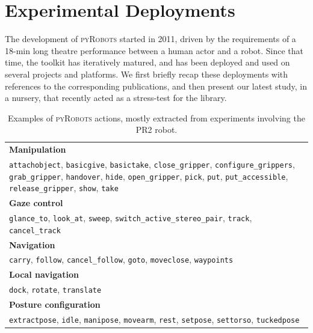 \documentclass[a4paper, 10pt, conference]{ieeeconf}      %
\newcommand{\pyRobots}{\textsc{pyRobots}}
\begin{document}
\section{Experimental Deployments}

The development of \pyRobots{} started in 2011, driven by the requirements of a
18-min long theatre performance between a human actor and a robot. Since that time, the toolkit has
iteratively matured, and has been deployed and used on several projects and
platforms. We first briefly recap these deployments with references to the
corresponding publications, and then present our latest study, in a nursery,
that recently acted as a stress-test for the library.

\begin{table}[ht!]
\begin{center}
\begin{tabular}{p{}}
    \toprule
    {\bf Manipulation} \\
     {\tt attachobject}, {\tt basicgive}, {\tt basictake}, {\tt close\_gripper}, {\tt configure\_grippers}, {\tt grab\_gripper}, {\tt handover}, {\tt hide}, {\tt open\_gripper}, {\tt pick}, {\tt put}, {\tt put\_accessible}, {\tt release\_gripper}, {\tt show}, {\tt take} \\
     \midrule
    {\bf Gaze control} \\
     {\tt glance\_to}, {\tt look\_at}, {\tt sweep}, {\tt switch\_active\_stereo\_pair}, {\tt track}, {\tt cancel\_track} \\
     \midrule
    {\bf Navigation} \\
     {\tt carry}, {\tt follow}, {\tt cancel\_follow}, {\tt goto}, {\tt moveclose}, {\tt waypoints} \\
     \midrule
    {\bf Local navigation} \\
     {\tt dock}, {\tt rotate}, {\tt translate} \\
     \midrule
    {\bf Posture configuration} \\
     {\tt extractpose}, {\tt idle}, {\tt manipose}, {\tt movearm}, {\tt rest}, {\tt setpose}, {\tt settorso}, {\tt tuckedpose} \\
     \bottomrule
\end{tabular}
\end{center}
\caption{Examples of \pyRobots{} actions, mostly extracted from experiments involving
    the PR2 robot.}

\label{pyrobots_actions}
\end{table}
\end{document}
